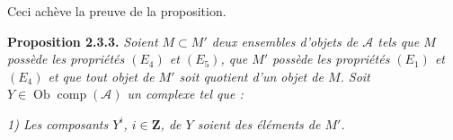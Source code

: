 Ceci achève la preuve de la proposition.

\medskip\noindent\textbf{Proposition 2.3.3.}
\textit{Soient $M\subset M'$ deux ensembles d'objets de $\mathcal A$ tels que
$M$ possède les propriétés $(E_4)$ et $(E_5)$, que $M'$ possède les
propriétés $(E_1)$ et $(E_4)$ et que tout objet de $M'$ soit quotient d'un
objet de $M$. Soit $Y\in\operatorname{Ob}\operatorname{comp}(\mathcal A)$ un
complexe tel que :}

\noindent\textit{1) Les composants $Y^i$, $i\in\mathbf Z$, de $Y$ soient
des éléments de $M'$.}
\endgroup
